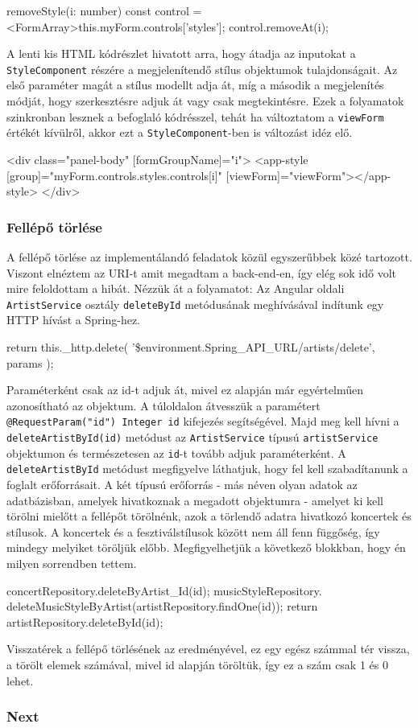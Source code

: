 \begin{java}
 removeStyle(i: number) {
    const control = <FormArray>this.myForm.controls['styles'];
    control.removeAt(i);
  }
\end{java}
A lenti kis HTML kódrészlet hivatott arra, hogy átadja az inputokat a \texttt{StyleComponent} részére a megjelenítendő stílus objektumok tulajdonságait. Az első paraméter magát a stílus modellt adja át, míg a második a megjelenítés módját, hogy szerkesztésre adjuk át vagy csak megtekintésre. Ezek a folyamatok szinkronban lesznek a befoglaló kódrésszel, tehát ha változtatom a \texttt{viewForm} értékét kívülről, akkor ezt a \texttt{StyleComponent}-ben is változást idéz elő.
\begin{java}
<div class="panel-body" [formGroupName]="i">
     <app-style [group]="myForm.controls.styles.controls[i]"
     [viewForm]="viewForm"></app-style>
</div>
\end{java}

\subsubsection{Fellépő törlése}
A fellépő törlése az implementálandó feladatok közül egyszerűbbek közé tartozott. Viszont elnéztem az URI-t amit megadtam a back-end-en, így elég sok idő volt mire feloldottam a hibát. Nézzük át a folyamatot: Az Angular oldali \texttt{ArtistService} osztály \texttt{deleteById} metódusának meghívásával indítunk egy HTTP hívást a Spring-hez.

\begin{java}
return this._http.delete(
'\${environment.Spring_API_URL}/artists/delete',{ params });
\end{java}

Paraméterként csak az id-t adjuk át, mivel ez alapján már egyértelműen azonosítható az objektum. A túloldalon átvesszük a paramétert \texttt{@RequestParam("id") Integer id} kifejezés segítségével.
Majd meg kell hívni a \texttt{deleteArtistById(id)} metódust az \texttt{ArtistService} típusú \texttt{artistService} objektumon és természetesen az \texttt{id}-t tovább adjuk paraméterként. A \texttt{deleteArtistById} metódust megfigyelve láthatjuk, hogy fel kell szabadítanunk a foglalt erőforrásait. A két típusú erőforrás - más néven olyan adatok az adatbázisban, amelyek hivatkoznak a megadott objektumra - amelyet ki kell törölni mielőtt a fellépőt törölnénk, azok a törlendő adatra hivatkozó koncertek és stílusok. A koncertek és a fesztiválstílusok között nem áll fenn függőség, így mindegy melyiket töröljük előbb. Megfigyelhetjük a következő blokkban, hogy én milyen sorrendben tettem.
\begin{java}
concertRepository.deleteByArtist_Id(id);
musicStyleRepository.
deleteMusicStyleByArtist(artistRepository.findOne(id));
return artistRepository.deleteById(id);
\end{java}
Visszatérek a fellépő törlésének az eredményével, ez egy egész számmal tér vissza, a törölt elemek számával, mivel id alapján töröltük, így ez a szám csak 1 és 0 lehet.
\subsubsection{Next}